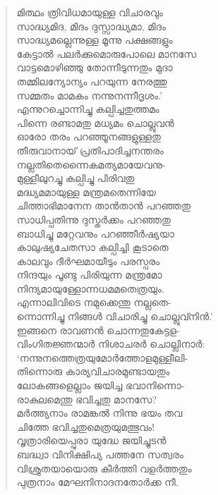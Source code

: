 \begin{verse}
മിത്ഥം ത്രിവിധമായുള്ള വിചാരവും\\
സാദ്ധ്യമിദ, മിദം ദുസ്സാദ്ധ്യമാ, മിദം\\
സാദ്ധ്യമല്ലെന്നുള്ള മൂന്നു പക്ഷങ്ങളും\\
കേട്ടാല്‍ പലര്‍ക്കുമൊരുപോലെ മാനസേ\\
വാട്ടമൊഴിഞ്ഞു തോന്നീടുന്നതും മുദാ\\
തമ്മിലന്യോന്യം പറയുന്ന നേരത്തു\\
സമ്മതം മാമകം നന്നുനന്നീദൃശം.’\\
എന്നുറച്ചൊന്നിച്ചു കല്പിച്ചതുത്തമം\\
പിന്നെ രണ്ടാമതു മധ്യമം ചൊല്ലുവന്‍\\
ഓരോ തരം പറഞ്ഞൂനങ്ങളുള്ളതു\\
തീരുവാനായ് പ്രതിപാദിച്ചനന്തരം\\
നല്ലതിതെന്നൈകമത്യമായേവനു-\\
മുള്ളീലുറച്ചു കല്പിച്ചു പിരിവതു\\
മദ്ധ്യമമായുള്ള മന്ത്രമതെന്നിയേ\\
ചിത്താഭിമാനേന താന്‍താന്‍ പറഞ്ഞതു\\
സാധിപ്പതിന്നു ദുസ്തര്‍ക്കം പറഞ്ഞതു\\
ബാധിച്ചു മറ്റേവനും പറഞ്ഞീര്‍ഷ്യയാ\\
കാലുഷ്യചേതസാ കല്പിച്ചി കൂടാതെ\\
കാലവും ദീര്‍ഘമായീടും പരസ്പരം\\
നിന്ദയും പൂണ്ടു പിരിയുന്ന മന്ത്രമോ\\
നിന്ദ്യമായുള്ളോന്നധമമതെത്രയും.\\
എന്നാലിവിടെ നമുക്കെന്തു നല്ലതെ-\\
ന്നൊന്നിച്ചു നിങ്ങള്‍ വിചാരിച്ചു ചൊല്ലുവ്നിന്‍.’\\
ഇങ്ങനെ രാവണന്‍ ചൊന്നതുകേട്ടള-\\
വിംഗിതജ്ഞന്മാര്‍ നിശാചരര്‍ ചൊല്ലിനാര്‍:\\
‘നന്നുനത്തെത്രയുമോര്‍ത്തോളമുള്ളീലി-\\
തിന്നൊരു കാര്യവിചാരമുണ്ടായതും\\
ലോകങ്ങളെല്ലാം ജയിച്ച ഭവാനിന്നൊ-\\
രാകുലമെന്തു ഭവിച്ചതു മാനസേ?\\
മര്‍ത്ത്യനാം രാമങ്കല്‍ നിന്നു ഭയം തവ\\
ചിത്തേ ഭവിച്ചതുമെത്രയുമത്ഭുവം!\\
വൃത്രാരിയെപ്പുരാ യുദ്ധേ ജയിച്ചുടന്‍\\
ബദ്ധ്വാ വിനിക്ഷിപ്യ പത്തനേ സത്വരം\\
വിശ്രുതയായൊരു കീര്‍ത്തി വളര്‍ത്തതും\\
പുത്രനാം മേഘനിനാദനതോര്‍ക്ക നീ.\\

\end{verse}
